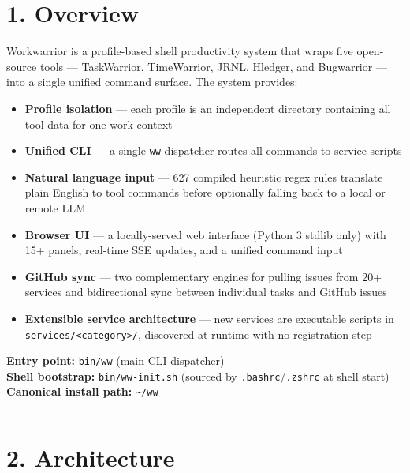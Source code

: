 \documentclass[
]{article}
\author{}
\date{}
\providecommand{\tightlist}{%
  \setlength{\itemsep}{0pt}\setlength{\parskip}{0pt}}
\begin{document}
{
\setcounter{tocdepth}{3}
\tableofcontents
}
\section{1. Overview}\label{overview}

Workwarrior is a profile-based shell productivity system that wraps five
open-source tools --- TaskWarrior, TimeWarrior, JRNL, Hledger, and
Bugwarrior --- into a single unified command surface. The system
provides:

\begin{itemize}
\tightlist
\item
  \textbf{Profile isolation} --- each profile is an independent
  directory containing all tool data for one work context
\item
  \textbf{Unified CLI} --- a single \texttt{ww} dispatcher routes all
  commands to service scripts
\item
  \textbf{Natural language input} --- 627 compiled heuristic regex rules
  translate plain English to tool commands before optionally falling
  back to a local or remote LLM
\item
  \textbf{Browser UI} --- a locally-served web interface (Python 3
  stdlib only) with 15+ panels, real-time SSE updates, and a unified
  command input
\item
  \textbf{GitHub sync} --- two complementary engines for pulling issues
  from 20+ services and bidirectional sync between individual tasks and
  GitHub issues
\item
  \textbf{Extensible service architecture} --- new services are
  executable scripts in
  \texttt{services/\textless{}category\textgreater{}/}, discovered at
  runtime with no registration step
\end{itemize}

\textbf{Entry point:} \texttt{bin/ww} (main CLI dispatcher)\\
\textbf{Shell bootstrap:} \texttt{bin/ww-init.sh} (sourced by
\texttt{.bashrc}/\texttt{.zshrc} at shell start)\\
\textbf{Canonical install path:} \texttt{\textasciitilde{}/ww}

\begin{center}\rule{0.5\linewidth}{0.5pt}\end{center}

\section{2. Architecture}\label{architecture}
\end{document}
